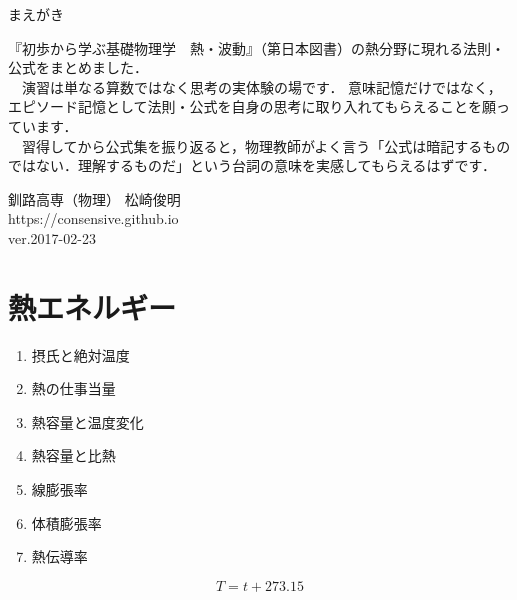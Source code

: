 \documentclass[10pt]{jarticle}
\begin{document}
\addtocounter{page}{-1}
\thispagestyle{empty}

まえがき\\

{\scriptsize
『初歩から学ぶ基礎物理学　熱・波動』（第日本図書）の熱分野に現れる法則・公式をまとめました．\\

　演習は単なる算数ではなく思考の実体験の場です．
意味記憶だけではなく，エピソード記憶として法則・公式を自身の思考に取り入れてもらえることを願っています．\\

　習得してから公式集を振り返ると，物理教師がよく言う「公式は暗記するものではない．理解するものだ」という台詞の意味を実感してもらえるはずです．


\vfill
\hfill 釧路高専（物理） 松崎俊明\\
\hfill https://consensive.github.io\\

\vskip-3mm \hfill ver.2017-02-23\\
}



\addtocounter{page}{-1}
\thispagestyle{empty}
\tableofcontents



\newpage
\addtocounter{page}{-1}
\thispagestyle{empty}
\section{熱エネルギー}


\begin{enumerate}
\small
\itemsep-4mm
\item 摂氏と絶対温度\\
\item 熱の仕事当量\\
\item 熱容量と温度変化\\
\item 熱容量と比熱\\
\item 線膨張率\\
\item 体積膨張率\\
\item 熱伝導率
\end{enumerate}


\newpage
\[
	T = t + 273.15
\]
\end{document}
